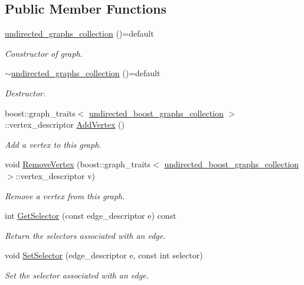 \subsection*{Public Member Functions}
\begin{DoxyCompactItemize}
\item 
\hyperlink{structundirected__graphs__collection_ae3ecc7dc5bc9733573cc759022032235}{undirected\+\_\+graphs\+\_\+collection} ()=default
\begin{DoxyCompactList}\small\item\em Constructor of graph. \end{DoxyCompactList}\item 
\hyperlink{structundirected__graphs__collection_aff2a4d871e6c23322dd046414655d72c}{$\sim$undirected\+\_\+graphs\+\_\+collection} ()=default
\begin{DoxyCompactList}\small\item\em Destructor. \end{DoxyCompactList}\item 
boost\+::graph\+\_\+traits$<$ \hyperlink{graph_8hpp_ab216188797d8e0a41236453b1a520b16}{undirected\+\_\+boost\+\_\+graphs\+\_\+collection} $>$\+::vertex\+\_\+descriptor \hyperlink{structundirected__graphs__collection_abe1778a200f95ec69a2a7d47a12ec03a}{Add\+Vertex} ()
\begin{DoxyCompactList}\small\item\em Add a vertex to this graph. \end{DoxyCompactList}\item 
void \hyperlink{structundirected__graphs__collection_a6130fc3591740847e69e04ab702fffc5}{Remove\+Vertex} (boost\+::graph\+\_\+traits$<$ \hyperlink{graph_8hpp_ab216188797d8e0a41236453b1a520b16}{undirected\+\_\+boost\+\_\+graphs\+\_\+collection} $>$\+::vertex\+\_\+descriptor v)
\begin{DoxyCompactList}\small\item\em Remove a vertex from this graph. \end{DoxyCompactList}\item 
int \hyperlink{structundirected__graphs__collection_ae158b1b071dac0c598811834596bef0d}{Get\+Selector} (const edge\+\_\+descriptor e) const
\begin{DoxyCompactList}\small\item\em Return the selectors associated with an edge. \end{DoxyCompactList}\item 
void \hyperlink{structundirected__graphs__collection_aa3154100fd670c092b828f244fec58e0}{Set\+Selector} (edge\+\_\+descriptor e, const int selector)
\begin{DoxyCompactList}\small\item\em Set the selector associated with an edge. \end{DoxyCompactList}\end{DoxyCompactItemize}


